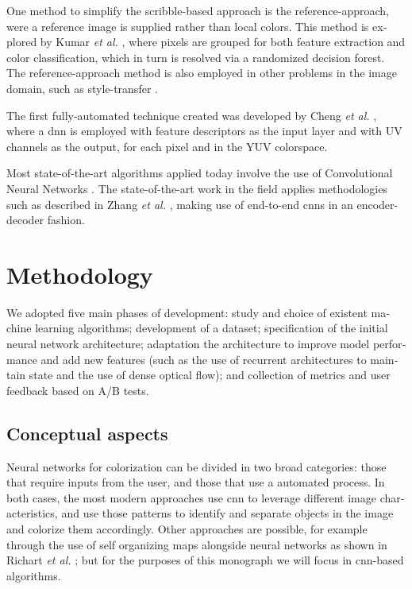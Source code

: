 \documentclass[12pt,openright,oneside,a4paper,english, brazilian]{abntex2}
\begin{document}
\begin{otherlanguage}{english}
One method to simplify the scribble-based approach is the reference-approach, were a reference image is supplied rather than local colors. This method is explored by Kumar \textit{et al.} \cite{Kumar2012},
where pixels are grouped for both feature extraction and color classification, which in turn is resolved via a randomized decision forest. The reference-approach method is also employed in other problems in the image domain, such as style-transfer \cite{Ruder2016}.

The first fully-automated technique created was developed by Cheng \textit{et al.} \cite{Cheng2015},
where a \acrfull{dnn} is employed with feature descriptors as the input layer and with UV channels as the output, for each pixel and in the YUV colorspace.

Most state-of-the-art algorithms applied today involve the use of Convolutional Neural Networks \cite{Larsson2016} \cite{Iizuka2016}. The state-of-the-art work in the field applies methodologies such as described in Zhang \textit{et al.} \cite{colorful}, making use of end-to-end \acrshort{cnn}s in an encoder-decoder fashion.

\chapter{Methodology}

We adopted five main phases of development: study and choice of existent machine learning algorithms; development of a dataset; specification of the initial neural network architecture; adaptation the architecture to improve model performance and add new features (such as the use of recurrent architectures to maintain state and the use of dense optical flow); and collection of metrics and user feedback based on A/B tests.

\section{Conceptual aspects} \label{sec:Concept}
Neural networks for colorization can be divided in two broad categories: those that require inputs from the user, and those that use a automated process. In both cases, the most modern approaches use \acrshort{cnn} to leverage different image characteristics, and use those patterns to identify and separate objects in the image and colorize them accordingly. Other approaches are possible, for example through the use of self organizing maps alongside neural networks as shown in Richart \textit{et al.} \cite{Richart_som_nn}; but for the purposes of this monograph we will focus in \acrshort{cnn}-based algorithms.


\end{otherlanguage}
\end{document}
